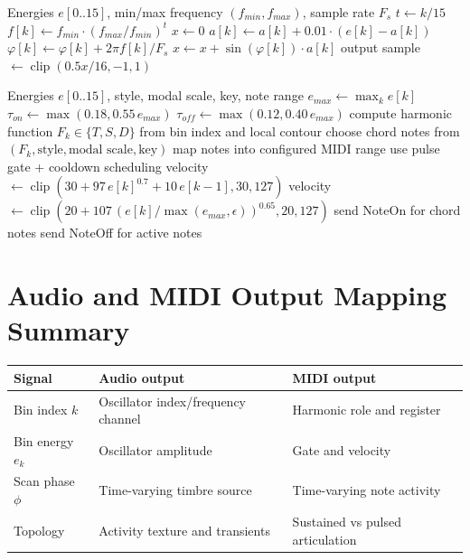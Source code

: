 \documentclass[11pt,a4paper]{article}
\begin{document}
\begin{algorithm}[H]
\caption{Audio Mapping: Bins to Additive Oscillator Bank}
\begin{algorithmic}[1]
\Require Energies $e[0..15]$, min/max frequency $(f_{min}, f_{max})$, sample rate $F_s$
    \State $t \gets k/15$
    \State $f[k] \gets f_{min}\cdot (f_{max}/f_{min})^{t}$ 
\EndFor
{}
    \State $x \gets 0$
        \State $a[k] \gets a[k] + 0.01\cdot(e[k]-a[k])$ 
        \State $\varphi[k] \gets \varphi[k] + 2\pi f[k]/F_s$
        \State $x \gets x + \sin(\varphi[k])\cdot a[k]$
    \EndFor
    \State output sample $\gets \operatorname{clip}(0.5x/16,-1,1)$
\EndFor
\end{algorithmic}
\end{algorithm}

\begin{algorithm}[H]
\caption{MIDI Mapping: Bins to Notes and Velocity}
\begin{algorithmic}[1]
\Require Energies $e[0..15]$, style, modal scale, key, note range
\State $e_{max} \gets \max_k e[k]$
\State $\tau_{on} \gets \max(0.18, 0.55\,e_{max})$
\State $\tau_{off} \gets \max(0.12, 0.40\,e_{max})$
    \State compute harmonic function $F_k \in \{T,S,D\}$ from bin index and local contour
    \State choose chord notes from $(F_k, \text{style}, \text{modal scale}, \text{key})$
    \State map notes into configured MIDI range
        \State use pulse gate + cooldown scheduling
        \State velocity $\gets \operatorname{clip}(30 + 97\,e[k]^{0.7} + 10\,e[k-1], 30,127)$
    \Else
            \State velocity $\gets \operatorname{clip}(20 + 107\,(e[k]/\max(e_{max},\epsilon))^{0.65},20,127)$
            \State send NoteOn for chord notes
            \State send NoteOff for active notes
        \EndIf
    \EndIf
\EndFor
\end{algorithmic}
\end{algorithm}

\section{Audio and MIDI Output Mapping Summary}

\begin{center}
\begin{tabular}{@{}lll@{}}
\toprule
Signal & Audio output & MIDI output \\
\midrule
Bin index $k$ & Oscillator index/frequency channel & Harmonic role and register \\
Bin energy $e_k$ & Oscillator amplitude & Gate and velocity \\
Scan phase $\phi$ & Time-varying timbre source & Time-varying note activity \\
Topology & Activity texture and transients & Sustained vs pulsed articulation \\
\bottomrule
\end{tabular}
\end{center}
\end{document}
